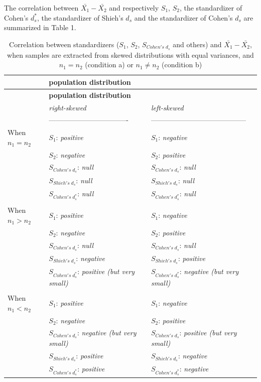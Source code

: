\documentclass[
  english,
  man,mask]{apa6}
\begin{document}
The correlation between \(\bar{X_1}-\bar{X_2}\) and respectively \(S_1\), \(S_2\), the standardizer of Cohen's \(d^*_s\), the standardizer of Shieh's \(d_s\) and the standardizer of Cohen's \(d_s\) are summarized in Table 1.

\begin{longtable}[]{@{}
  >{\raggedright\arraybackslash}p{}
  >{\centering\arraybackslash}p{}
  >{\centering\arraybackslash}p{}@{}}
\caption{Correlation between standardizers (\(S_1\), \(S_2\), \(S_{Cohen's \; d_s}\) and others) and \(\bar{X_1}-\bar{X_2}\), when samples are extracted from skewed distributions with equal variances, and \(n_1=n_2\) (condition a) or \(n_1 \neq n_2\) (condition b)}\tabularnewline
\toprule
& \textbf{\textbf{population distribution}} & \\
\midrule
\endfirsthead
\toprule
& \textbf{\textbf{population distribution}} & \\
\midrule
\endhead
& \emph{right-skewed} & \emph{left-skewed} \\
& ---------------------------------- & ----------------------------------------- \\
When \(n_1=n_2\) & \(S_1\): \emph{positive} & \(S_1\): \emph{negative} \\
& \(S_2\): \emph{negative} & \(S_2\): \emph{positive} \\
& \(S_{Cohen's \; d_s}\): \emph{null} & \(S_{Cohen's \; d_s}\): \emph{null} \\
& \(S_{Shieh's \; d_s}\): \emph{null} & \(S_{Shieh's \; d_s}\): \emph{null} \\
& \(S_{Cohen's \; d^*_s}\): \emph{null} & \(S_{Cohen's \; d^*_s}\): \emph{null} \\
& & \\
When \(n_1>n_2\) & \(S_1\): \emph{positive} & \(S_1\): \emph{negative} \\
& \(S_2\): \emph{negative} & \(S_2\): \emph{positive} \\
& \(S_{Cohen's \; d_s}\): \emph{null} & \(S_{Cohen's \; d_s}\): \emph{null} \\
& \(S_{Shieh's \; d_s}\): \emph{negative} & \(S_{Shieh's \; d_s}\): \emph{positive} \\
& \(S_{Cohen's \; d^*_s}\): \emph{positive (but very small)} & \(S_{Cohen's \; d^*_s}\): \emph{negative (but very small)} \\
& & \\
When \(n_1<n_2\) & \(S_1\): \emph{positive} & \(S_1\): \emph{negative} \\
& \(S_2\): \emph{negative} & \(S_2\): \emph{positive} \\
& \(S_{Cohen's \; d_s}\): \emph{negative (but very small)} & \(S_{Cohen's \; d_s}\): \emph{positive (but very small)} \\
& \(S_{Shieh's \; d_s}\): \emph{positive} & \(S_{Shieh's \; d_s}\): \emph{negative} \\
& \(S_{Cohen's \; d^*_s}\): \emph{positive} & \(S_{Cohen's \; d^*_s}\): \emph{negative} \\
\bottomrule
\end{longtable}
\end{document}
